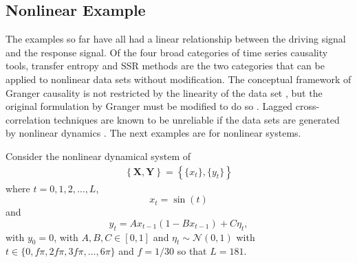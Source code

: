\documentclass[twocolumn,aps,pre,groupedaddress]{revtex4-1}
\begin{document}
\subsection{Nonlinear Example}
\label{sec:nonli}

The examples so far have all had a linear relationship between the driving signal and the response signal.  Of the four broad categories of time series causality tools, transfer entropy \cite{kaiser2002} and SSR methods \cite{Sugihara2012} are the two categories that can be applied to nonlinear data sets without modification.  The conceptual framework of Granger causality is not restricted by the linearity of the data set \cite{Granger1980}, but the original formulation by Granger must be modified to do so \cite{Sun2008}.  Lagged cross-correlation techniques are known to be unreliable if the data sets are generated by nonlinear dynamics \cite{Rogosa1980}.  The next examples are for nonlinear systems.

Consider the nonlinear dynamical system of
\begin{eqnarray}
\label{eqn:nonlinearEX}
\left\{\mathbf{X},\mathbf{Y}\right\} = \left\{\{x_t\},\{y_t\}\right\}
\end{eqnarray}
where $t=0,1,2,\ldots,L$,
\begin{equation*}
x_t = \sin(t)
\end{equation*}
and
\begin{equation*}
y_t = Ax_{t-1}\left(1-Bx_{t-1}\right)+C\eta_t,
\end{equation*}
with $y_0 = 0$, with $A,B,C\in[0,1]$ and $\eta_t\sim\mathcal{N}\left(0,1\right)$ with $t\in\{0,f\pi,2f\pi,3f\pi,\ldots,6\pi\}$ and $f=1/30$ so that $L=181$.
\end{document}
